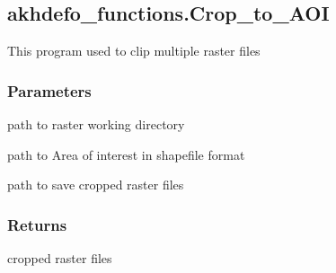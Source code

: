 \documentclass[letterpaper,10pt]{sphinxmanual}
\begin{document}
\sphinxstepscope


\subsection{akhdefo\_functions.Crop\_to\_AOI}
\label{\detokenize{generated/akhdefo_functions.Crop_to_AOI:akhdefo-functions-crop-to-aoi}}\label{\detokenize{generated/akhdefo_functions.Crop_to_AOI::doc}}

\begin{fulllineitems}
\label{\detokenize{generated/akhdefo_functions.Crop_to_AOI:akhdefo_functions.Crop_to_AOI}}
\pysigstartsignatures
{}
\pysigstopsignatures
\sphinxAtStartPar
This program used to clip multiple  raster files


\subsubsection{Parameters}
\label{\detokenize{generated/akhdefo_functions.Crop_to_AOI:parameters}}\begin{description}
\sphinxAtStartPar
path to raster working directory

\sphinxAtStartPar
path to Area of interest in shapefile format

\sphinxAtStartPar
path to save cropped raster files

\end{description}


\subsubsection{Returns}
\label{\detokenize{generated/akhdefo_functions.Crop_to_AOI:returns}}
\sphinxAtStartPar
cropped raster files

\end{fulllineitems}
\end{document}
